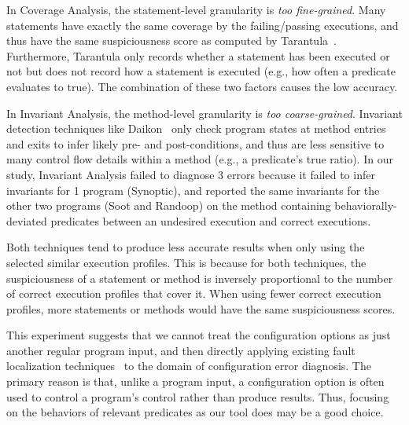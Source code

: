 In Coverage Analysis, the statement-level granularity is \textit{too fine-grained}.
Many statements have exactly the same coverage by the failing/passing executions,
and thus have the same suspiciousness score as computed by Tarantula~\cite{Jones:2002}.
Furthermore, Tarantula only records whether a
statement has been executed or not but does not record how a statement is 
executed (e.g., how often a predicate evaluates to true). The combination
of these two factors causes the low accuracy.


In Invariant Analysis, the method-level granularity is \textit{too coarse-grained}.
Invariant detection techniques like Daikon~\cite{Ernst:1999}
only check program states at method entries and exits to infer
likely pre- and post-conditions, and thus are less
sensitive to many control flow details within a method (e.g., a predicate's
true ratio). In our study, Invariant Analysis failed to diagnose 3
errors because it failed to infer invariants for 1 program (Synoptic),
and reported the same invariants for the other two programs (Soot and Randoop)
on the method containing behaviorally-deviated predicates between an undesired execution and correct executions.

Both techniques tend to produce less accurate results when only
using the selected similar execution profiles. This is because
for both techniques, the suspiciousness of a statement or method
is inversely proportional to the number of correct execution profiles that cover
it. When using fewer correct execution profiles,
more statements or methods would have the same suspiciousness scores.





This experiment suggests that we cannot
treat the configuration options as just another regular program input,
and then directly applying existing 
fault localization techniques~\cite{Jones:2002, McCamant:2003} to the domain of
configuration error diagnosis.
The primary reason is that, unlike a program input,
a configuration option is often used to control a
program's control rather than produce results. 
Thus, focusing on the behaviors of relevant predicates as our tool does
 may be a good choice.
